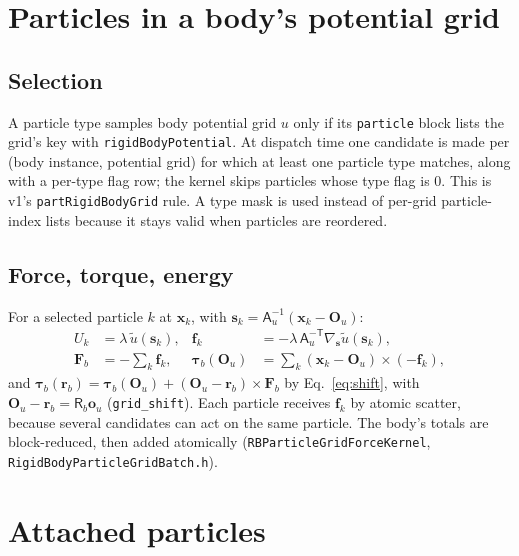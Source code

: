 \documentclass[11pt]{article}
\newcommand{\vb}[1]{\bm{#1}}
\newcommand{\code}[1]{\texttt{#1}}
\begin{document}
\section{Particles in a body's potential grid}
\label{sec:pgrid}

\subsection{Selection}

A particle type samples body potential grid $u$ only if its \code{particle}
block lists the grid's key with \code{rigidBodyPotential}. At dispatch time
one candidate is made per (body instance, potential grid) for which at least
one particle type matches, along with a per-type flag row; the kernel skips
particles whose type flag is 0. This is v1's \code{partRigidBodyGrid} rule.
A type mask is used instead of per-grid particle-index lists because it stays
valid when particles are reordered.

\subsection{Force, torque, energy}

For a selected particle $k$ at $\vb x_k$,
with $\vb s_k=\mathsf A_u^{-1}(\vb x_k-\vb O_u)$:
\begin{align}
  U_k &= \lambda\,\tilde u(\vb s_k), &
  \vb f_k &= -\lambda\,\mathsf A_u^{-\mathsf T}\nabla_{\vb s}\tilde u(\vb s_k),\\
  \vb F_b &= -\sum_k\vb f_k, &
  \vb\tau_b(\vb O_u) &= \sum_k(\vb x_k-\vb O_u)\times(-\vb f_k),
\end{align}
and $\vb\tau_b(\vb r_b)=\vb\tau_b(\vb O_u)+(\vb O_u-\vb r_b)\times\vb F_b$ by
Eq.~\eqref{eq:shift}, with $\vb O_u-\vb r_b=\mathsf R_b\vb o_u$
(\code{grid\_shift}). Each particle receives $\vb f_k$ by atomic scatter,
because several candidates can act on the same particle. The body's totals are
block-reduced, then added atomically
(\code{RBParticleGridForceKernel}, \code{RigidBodyParticleGridBatch.h}).

\section{Attached particles}
\label{sec:attached}
\end{document}

